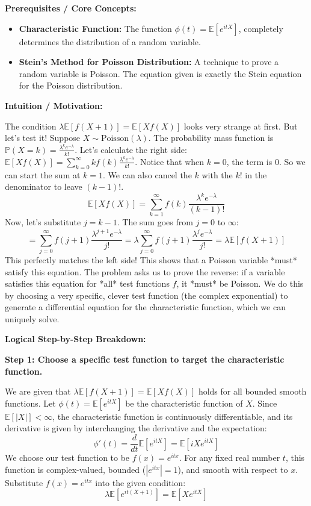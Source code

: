 \begin{solution}
\textbf{Prerequisites / Core Concepts:}
\begin{itemize}
    \item \textbf{Characteristic Function:} The function $\phi(t) = \mathbb{E}[e^{itX}]$, completely determines the distribution of a random variable.
    \item \textbf{Stein's Method for Poisson Distribution:} A technique to prove a random variable is Poisson. The equation given is exactly the Stein equation for the Poisson distribution.
\end{itemize}

\textbf{Intuition / Motivation:}

The condition $\lambda \mathbb{E}[f(X+1)] = \mathbb{E}[Xf(X)]$ looks very strange at first. But let's test it!
Suppose $X \sim \text{Poisson}(\lambda)$. The probability mass function is $\mathbb{P}(X=k) = \frac{\lambda^k e^{-\lambda}}{k!}$.
Let's calculate the right side: $\mathbb{E}[Xf(X)] = \sum_{k=0}^\infty k f(k) \frac{\lambda^k e^{-\lambda}}{k!}$.
Notice that when $k=0$, the term is 0. So we can start the sum at $k=1$. We can also cancel the $k$ with the $k!$ in the denominator to leave $(k-1)!$.
\[ \mathbb{E}[Xf(X)] = \sum_{k=1}^\infty f(k) \frac{\lambda^k e^{-\lambda}}{(k-1)!} \]
Now, let's substitute $j = k-1$. The sum goes from $j=0$ to $\infty$:
\[ = \sum_{j=0}^\infty f(j+1) \frac{\lambda^{j+1} e^{-\lambda}}{j!} = \lambda \sum_{j=0}^\infty f(j+1) \frac{\lambda^j e^{-\lambda}}{j!} = \lambda \mathbb{E}[f(X+1)] \]
This perfectly matches the left side! This shows that a Poisson variable *must* satisfy this equation.
The problem asks us to prove the reverse: if a variable satisfies this equation for *all* test functions $f$, it *must* be Poisson. We do this by choosing a very specific, clever test function (the complex exponential) to generate a differential equation for the characteristic function, which we can uniquely solve.

\textbf{Logical Step-by-Step Breakdown:}

\textbf{Step 1: Choose a specific test function to target the characteristic function.}

We are given that $\lambda \mathbb{E}[f(X+1)] = \mathbb{E}[Xf(X)]$ holds for all bounded smooth functions.
Let $\phi(t) = \mathbb{E}[e^{itX}]$ be the characteristic function of $X$.
Since $\mathbb{E}[|X|] < \infty$, the characteristic function is continuously differentiable, and its derivative is given by interchanging the derivative and the expectation:
\[ \phi'(t) = \frac{d}{dt} \mathbb{E}[e^{itX}] = \mathbb{E}[i X e^{itX}] \]
We choose our test function to be $f(x) = e^{itx}$. For any fixed real number $t$, this function is complex-valued, bounded ($|e^{itx}| = 1$), and smooth with respect to $x$.
Substitute $f(x) = e^{itx}$ into the given condition:
\[ \lambda \mathbb{E}[e^{it(X+1)}] = \mathbb{E}[X e^{itX}] \]


\end{solution}
